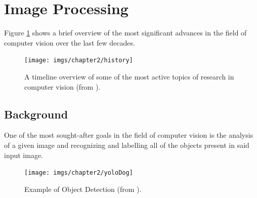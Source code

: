 \begin{table}[ht]
\label{tab:tabelauav}
\end{table}
     

\section{Image Processing }  


Figure \ref{fig:history} shows a brief overview of the most significant advances in the field of computer vision over the last few decades.  


\begin{figure}[h] 
\centerline{\texttt{[image: imgs/chapter2/history]}}
\caption{A timeline overview of some of the most active topics of research in computer
vision (from \cite{livro}).}
\label{fig:history}
\end{figure}


\subsection{Background}


One of the most sought-after goals in the field of computer vision is the analysis of a given image and recognizing and labelling all of the objects present in said input image. 

\begin{figure}[h] 
\centerline{\texttt{[image: imgs/chapter2/yoloDog]}}
\caption{Example of Object Detection (from \cite{yoloDog}).}
\label{fig:yoloDog}
\end{figure}






